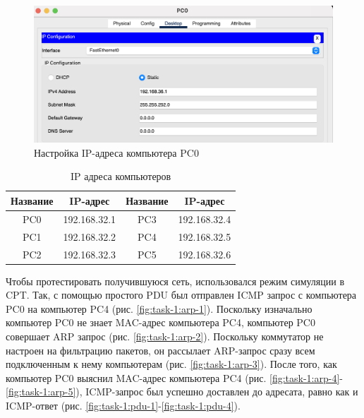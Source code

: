 \documentclass[a4paper, 14pt]{extarticle}
\begin{document}
\begin{figure}[H]
  \centering
  \includegraphics[width=\textwidth]{images/task-1/ip-config.png}
  \caption{Настройка IP-адреса компьютера PC0}
  \label{fig:task-1:ip-config}
\end{figure}

\begin{table}[H]
  \centering
  \caption{IP адреса компьютеров}
  \label{tab:task-1:ip-config}

  \setlength{\tabcolsep}{12pt}
  \renewcommand*{\arraystretch}{1.5}

  \begin{tabular}{|c|c|c|c|}
    \hline
    \textbf{Название} & \textbf{IP-адрес} & \textbf{Название} & \textbf{IP-адрес} \\
    \hline
    PC0               & 192.168.32.1      & PC3               & 192.168.32.4      \\
    \hline
    PC1               & 192.168.32.2      & PC4               & 192.168.32.5      \\
    \hline
    PC2               & 192.168.32.3      & PC5               & 192.168.32.6      \\
    \hline
  \end{tabular}
\end{table}

Чтобы протестировать получившуюся сеть, использовался режим симуляции в CPT.
Так, с помощью простого PDU был отправлен ICMP запрос с компьютера PC0 на
компьютер PC4 (рис. \ref{fig:task-1:arp-1}). Поскольку изначально компьютер PC0
не знает MAC-адрес компьютера PC4, компьютер PC0 совершает ARP запрос (рис.
\ref{fig:task-1:arp-2}). Поскольку коммутатор не настроен на фильтрацию пакетов,
он рассылает ARP-запрос сразу всем подключенным к нему компьютерам (рис.
\ref{fig:task-1:arp-3}). После того, как компьютер PC0 выяснил MAC-адрес
компьютера PC4 (рис. \ref{fig:task-1:arp-4}-\ref{fig:task-1:arp-5}), ICMP-запрос
был успешно доставлен до адресата, равно как и ICMP-ответ (рис.
\ref{fig:task-1:pdu-1}-\ref{fig:task-1:pdu-4}).
\end{document}
